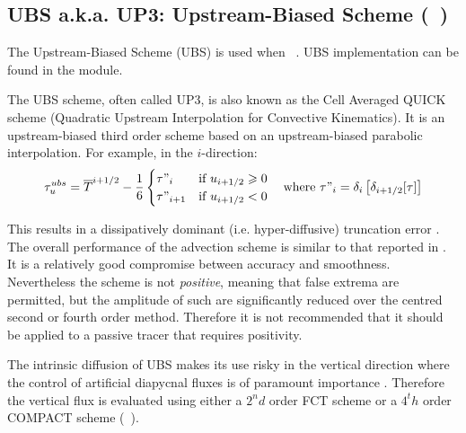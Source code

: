 \documentclass[../main/NEMO_manual]{subfiles}
\begin{document}
\subsection{UBS a.k.a. UP3: Upstream-Biased Scheme (\protect{}~)}
\label{subsec:TRA_adv_ubs}

The Upstream-Biased Scheme (UBS) is used when ~.
UBS implementation can be found in the  module.

The UBS scheme, often called UP3, is also known as the Cell Averaged QUICK scheme
(Quadratic Upstream Interpolation for Convective Kinematics).
It is an upstream-biased third order scheme based on an upstream-biased parabolic interpolation.
For example, in the $i$-direction:
\begin{equation}
  \label{eq:tra_adv_ubs}
  \tau_u^{ubs} = \overline T ^{i + 1/2} - \frac{1}{6}
    \begin{cases}
                                                      \tau"_i       & \text{if~} u_{i + 1/2} \geqslant 0 \\
                                                      \tau"_{i + 1} & \text{if~} u_{i + 1/2} <         0
    \end{cases}
  \quad
  \text{where~} \tau"_i = \delta_i \left[ \delta_{i + 1/2} [\tau] \right]
\end{equation}

This results in a dissipatively dominant (i.e. hyper-diffusive) truncation error
\citep{Shchepetkin_McWilliams_OM05}.
The overall performance of the advection scheme is similar to that reported in \cite{Farrow1995}.
It is a relatively good compromise between accuracy and smoothness.
Nevertheless the scheme is not \textit{positive}, meaning that false extrema are permitted,
but the amplitude of such are significantly reduced over the centred second or fourth order method.
Therefore it is not recommended that it should be applied to a passive tracer that requires positivity.

The intrinsic diffusion of UBS makes its use risky in the vertical direction where
the control of artificial diapycnal fluxes is of paramount importance
\citep{Shchepetkin_McWilliams_OM05, Demange_PhD2014}.
Therefore the vertical flux is evaluated using either a $2^nd$ order FCT scheme or a $4^th$ order COMPACT scheme
(~).
\end{document}
